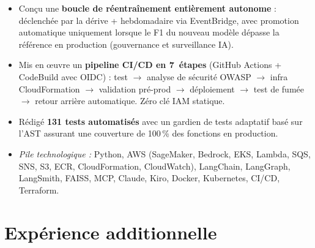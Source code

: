 \documentclass[10pt,a4paper,sans]{moderncv}
\begin{document}
{\begin{itemize}[leftmargin=1.2em, topsep=1pt, itemsep=0pt, parsep=0pt]
        $\rightarrow$ SQS $\rightarrow$ worker K8s $\rightarrow$ S3
        $\rightarrow$ alertes SNS) pour la haute disponibilité.
  \item Conçu une \textbf{boucle de réentraînement entièrement autonome} :
        déclenchée par la dérive + hebdomadaire via EventBridge, avec
        promotion automatique uniquement lorsque le F1 du nouveau modèle
        dépasse la référence en production (gouvernance et surveillance IA).
  \item Mis en \oe{}uvre un \textbf{pipeline CI/CD en 7~étapes} (GitHub Actions +
        CodeBuild avec OIDC) : test $\rightarrow$ analyse de sécurité OWASP
        $\rightarrow$ infra CloudFormation $\rightarrow$ validation pré-prod
        $\rightarrow$ déploiement $\rightarrow$ test de fumée $\rightarrow$
        retour arrière automatique. Zéro clé IAM statique.
  \item Rédigé \textbf{131 tests automatisés} avec un gardien de tests adaptatif
        basé sur l'AST assurant une couverture de 100\,\% des fonctions
        en production.
  \item \textit{Pile technologique :} Python, AWS (SageMaker, Bedrock, EKS,
        Lambda, SQS, SNS, S3, ECR, CloudFormation, CloudWatch), LangChain,
        LangGraph, LangSmith, FAISS, MCP, Claude, Kiro, Docker, Kubernetes,
        CI/CD, Terraform.
\end{itemize}}


\section{Expérience additionnelle}

\end{document}
